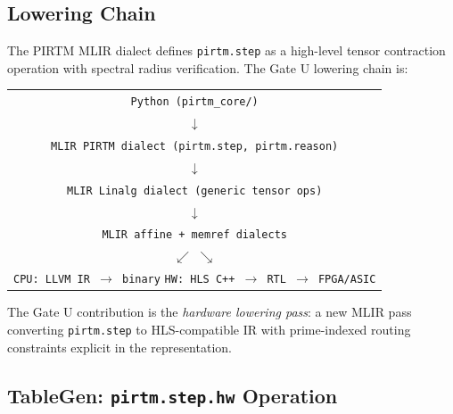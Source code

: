 \documentclass[12pt,letterpaper]{article}
\theoremstyle{plain}
\theoremstyle{definition}
\theoremstyle{remark}
\begin{document}
\subsection{Lowering Chain}

The PIRTM MLIR dialect defines \texttt{pirtm.step} as a high-level tensor
contraction operation with spectral radius verification. The Gate U lowering
chain is:

\begin{center}
\begin{tabular}{c}
\texttt{Python (pirtm\_core/)} \\
$\downarrow$ \\
\texttt{MLIR PIRTM dialect (pirtm.step, pirtm.reason)} \\
$\downarrow$ \\
\texttt{MLIR Linalg dialect (generic tensor ops)} \\
$\downarrow$ \\
\texttt{MLIR affine + memref dialects} \\
$\swarrow$ \hspace{3em} $\searrow$ \\
\texttt{CPU: LLVM IR $\to$ binary} \hspace{1em} \texttt{HW: HLS C++ $\to$ RTL $\to$ FPGA/ASIC}
\end{tabular}
\end{center}

The Gate U contribution is the \emph{hardware lowering pass}:
a new MLIR pass converting \texttt{pirtm.step} to HLS-compatible IR with
prime-indexed routing constraints explicit in the representation.

\subsection{TableGen: \texttt{pirtm.step.hw} Operation}
\end{document}
